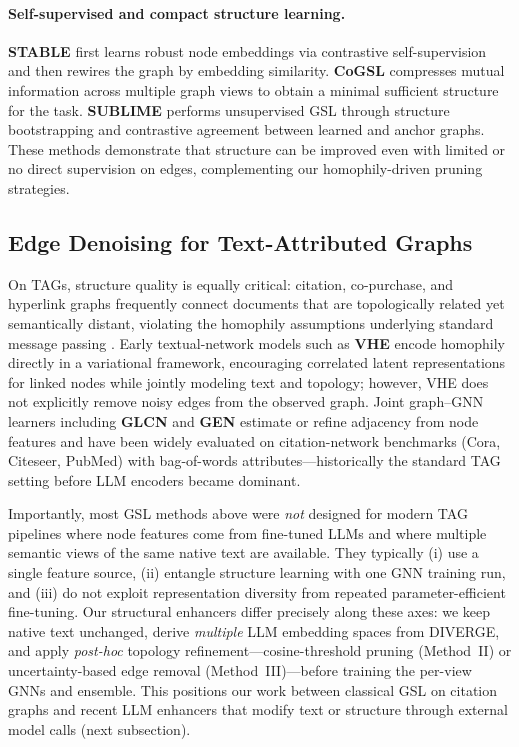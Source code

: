 \documentclass{article}
\begin{document}
\paragraph{Self-supervised and compact structure learning.}
\textbf{STABLE} \citep{li2022stable} first learns robust node embeddings via
contrastive self-supervision and then rewires the graph by embedding similarity.
\textbf{CoGSL} \citep{fatemi2022cogsl} compresses mutual information across multiple
graph views to obtain a minimal sufficient structure for the task.
\textbf{SUBLIME} \citep{liu2022sublime} performs unsupervised GSL through structure
bootstrapping and contrastive agreement between learned and anchor graphs. These
methods demonstrate that structure can be improved even with limited or no direct
supervision on edges, complementing our homophily-driven pruning strategies.


\subsection{Edge Denoising for Text-Attributed Graphs}
\label{sec:tag-structure-no-llm}

On TAGs, structure quality is equally critical: citation, co-purchase, and hyperlink
graphs frequently connect documents that are topologically related yet semantically
distant, violating the homophily assumptions underlying standard message passing
\citep{yang2019vhe,Zhang2024TAGSurvey}. Early textual-network models such as
\textbf{VHE} \citep{yang2019vhe} encode homophily directly in a variational
framework, encouraging correlated latent representations for linked nodes while
jointly modeling text and topology; however, VHE does not explicitly remove noisy
edges from the observed graph. Joint graph--GNN learners including \textbf{GLCN}
\citep{jiang2019glcn} and \textbf{GEN} \citep{wang2021gen} estimate or refine
adjacency from node features and have been widely evaluated on citation-network
benchmarks (Cora, Citeseer, PubMed) with bag-of-words attributes---historically the
standard TAG setting before LLM encoders became dominant.

Importantly, most GSL methods above were \emph{not} designed for modern TAG pipelines
where node features come from fine-tuned LLMs and where multiple semantic views of
the same native text are available. They typically (i) use a single feature source,
(ii) entangle structure learning with one GNN training run, and (iii) do not exploit
representation diversity from repeated parameter-efficient fine-tuning. Our structural
enhancers differ precisely along these axes: we keep native text unchanged, derive
\emph{multiple} LLM embedding spaces from DIVERGE, and apply \emph{post-hoc}
topology refinement---cosine-threshold pruning (Method~II) or uncertainty-based edge
removal (Method~III)---before training the per-view GNNs and ensemble. This positions
our work between classical GSL on citation graphs and recent LLM enhancers that modify
text or structure through external model calls (next subsection).
\end{document}
